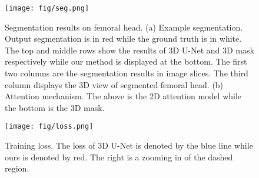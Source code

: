 \begin{figure}[t!]
\centering
\centerline{\texttt{[image: fig/seg.png]}}
\caption{Segmentation results on femoral head. (a) Example segmentation. Output segmentation is in red while the ground truth is in white. The top and middle rows show the results of 3D U-Net and 3D mask respectively while our method is displayed at the bottom. The first two columns are the segmentation results in image slices. The third column displays the 3D view of segmented femoral head. (b) Attention mechanism. The above is the 2D attention model while the bottom is the 3D mask.}
\label{fig:seg}
\end{figure}

\begin{figure}[t!]
\centering
\centerline{\texttt{[image: fig/loss.png]}}
\caption{Training loss. The loss of 3D U-Net is denoted by the blue line while ours is denoted by red. The right is a zooming in of the dashed region.}
\label{fig:loss}
\end{figure}



